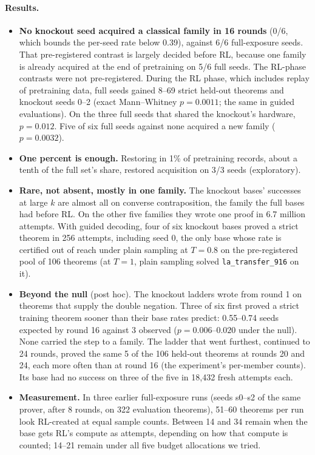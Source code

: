 \paragraph{Results.}
\begin{itemize}
\item \textbf{No knockout seed acquired a classical family in 16 rounds} (0/6, which bounds the per-seed rate below
0.39), against 6/6 full-exposure seeds. That pre-registered contrast is largely decided before RL, because one family is
already acquired at the end of pretraining on 5/6 full seeds. The RL-phase contrasts were not pre-registered. During the
RL phase, which includes replay of pretraining data, full seeds gained 8--69 strict held-out theorems and knockout seeds
0--2 (exact Mann--Whitney $p=0.0011$; the same in guided evaluations). On the three full seeds that shared the
knockout's hardware, $p=0.012$. Five of six full seeds against none acquired a new family ($p=0.0032$).
\item \textbf{One percent is enough.} Restoring \sig{} in 1\% of pretraining records, about a tenth of the full set's
share, restored acquisition on 3/3 seeds (exploratory).
\item \textbf{Rare, not absent, mostly in one family.} The knockout bases' successes at large $k$ are almost all on
converse contraposition, the family the full bases had before RL. On the other five families they wrote one \sig{}
proof in 6.7 million attempts. With guided decoding, four of six knockout bases proved a strict theorem in 256
attempts, including seed 0, the only base whose rate is certified out of reach under plain sampling at $T=0.8$ on
the pre-registered pool of 106 theorems (at $T=1$, plain sampling solved \texttt{la\_transfer\_916} on it).
\item \textbf{Beyond the null} (post hoc). The knockout ladders wrote \sig{} from round 1 on theorems that supply the
double negation. Three of six first proved a strict training theorem sooner than their base rates predict: 0.55--0.74 seeds
expected by round 16 against 3 observed ($p = 0.006$--$0.020$ under the null). None carried the step to a family. The
ladder that went furthest, continued to 24 rounds, proved the same 5 of the 106 held-out theorems at rounds 20 and 24,
each more often than at round 16 (the experiment's per-member counts). Its base had no success on three of the five in 18,432 fresh attempts each.
\item \textbf{Measurement.} In three earlier full-exposure runs (seeds s0--s2 of the same prover, after 8 rounds,
on 322 evaluation theorems), 51--60 theorems per run look RL-created at equal sample counts. Between 14 and 34
remain when the base gets RL's compute as attempts, depending on how that compute is counted; 14--21 remain under all
five budget allocations we tried.
\end{itemize}

